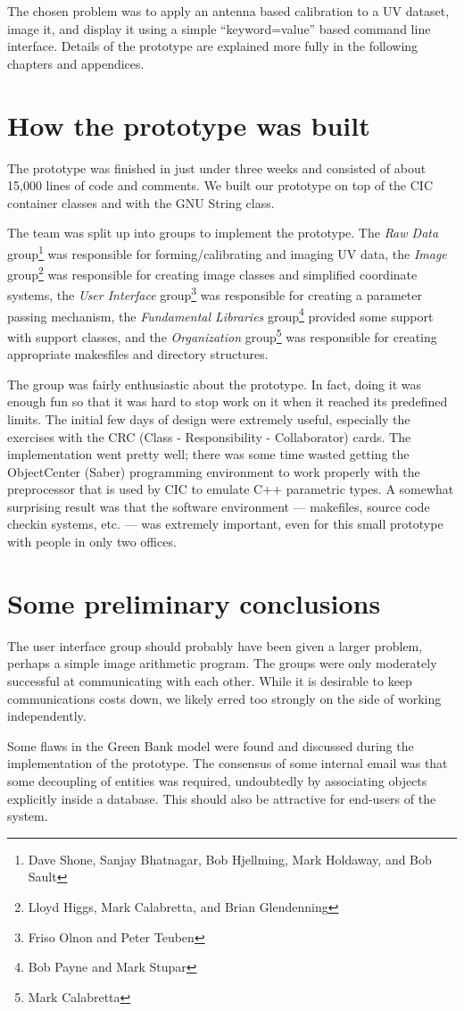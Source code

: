 The chosen problem was to apply an antenna based calibration to a UV
dataset, image it, and display it using a simple ``keyword=value''
based command line interface.  Details of the prototype are explained
more fully in the following chapters and appendices.

\section{How the prototype was built}

The prototype was finished in just under three weeks and consisted of
about 15,000 lines of code and comments. We built our prototype on top
of the CIC container classes and with the GNU String class.

The team was split up into groups to implement the prototype.
The {\em Raw Data} group\footnote
{Dave Shone, Sanjay Bhatnagar, Bob Hjellming, Mark Holdaway, and Bob Sault}
was responsible for forming/calibrating and imaging UV data,
the {\em Image} group\footnote
{Lloyd Higgs, Mark Calabretta, and Brian Glendenning}
was responsible for creating image classes and simplified coordinate systems,
the {\em User Interface} 
group\footnote{Friso Olnon and Peter Teuben}
was responsible for creating a parameter passing mechanism,
the {\em Fundamental Libraries} group\footnote
{Bob Payne and Mark Stupar}
provided some support with support classes,
and the {\em Organization} group\footnote{Mark Calabretta}
was responsible for creating
appropriate makesfiles and directory structures.

The group was fairly enthusiastic about the prototype. In fact, doing
it was enough fun so that it was hard to stop work on it when it
reached its predefined limits. The initial few days of design were
extremely useful, especially the exercises with the CRC (Class -
Responsibility - Collaborator) cards. The implementation went pretty
well; there was some time wasted getting the ObjectCenter (Saber)
programming environment to work properly with the preprocessor that is
used by CIC to emulate C++ parametric types. A somewhat surprising
result was that the software environment --- makefiles, source code
checkin systems, etc.  --- was extremely important, even for this
small prototype with people in only two offices.

\section{Some preliminary conclusions}

The user interface group should probably have been given a larger
problem, perhaps a simple image arithmetic program. The groups were
only moderately successful at communicating with each other. While it
is desirable to keep communications costs down, we likely erred too
strongly on the side of working independently.

Some flaws in the Green Bank model were found and discussed during the
implementation of the prototype. The consensus of some internal email
\cite{key3} was that some decoupling of entities was required,
undoubtedly by associating objects explicitly inside a database. This
should also be attractive for end-users of the system.
